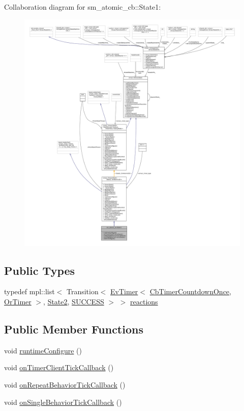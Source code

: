 Collaboration diagram for sm\+\_\+atomic\+\_\+cb\+:\+:State1\+:
\nopagebreak
\begin{figure}[H]
\begin{center}
\leavevmode
\includegraphics[width=350pt]{structsm__atomic__cb_1_1State1__coll__graph}
\end{center}
\end{figure}
\subsection*{Public Types}
\begin{DoxyCompactItemize}
\item 
typedef mpl\+::list$<$ Transition$<$ \hyperlink{structcl__ros__timer_1_1EvTimer}{Ev\+Timer}$<$ \hyperlink{classcl__ros__timer_1_1CbTimerCountdownOnce}{Cb\+Timer\+Countdown\+Once}, \hyperlink{classsm__atomic__cb_1_1OrTimer}{Or\+Timer} $>$, \hyperlink{structsm__atomic__cb_1_1State2}{State2}, \hyperlink{structsmacc_1_1default__transition__tags_1_1SUCCESS}{S\+U\+C\+C\+E\+SS} $>$ $>$ \hyperlink{structsm__atomic__cb_1_1State1_ae6b0d9c700105b185fb7c3372ba0c5ad}{reactions}
\end{DoxyCompactItemize}
\subsection*{Public Member Functions}
\begin{DoxyCompactItemize}
\item 
void \hyperlink{structsm__atomic__cb_1_1State1_a72dd5ac4a82271c55f1f3b07870746aa}{runtime\+Configure} ()
\item 
void \hyperlink{structsm__atomic__cb_1_1State1_a1e1f3cc8c74bc13e28ce47f133c2cecb}{on\+Timer\+Client\+Tick\+Callback} ()
\item 
void \hyperlink{structsm__atomic__cb_1_1State1_adeb0be6eca06949e0bbb254bff5945bc}{on\+Repeat\+Behavior\+Tick\+Callback} ()
\item 
void \hyperlink{structsm__atomic__cb_1_1State1_a5c34a516ff618f865f668d7db05b2cb8}{on\+Single\+Behavior\+Tick\+Callback} ()
\end{DoxyCompactItemize}
